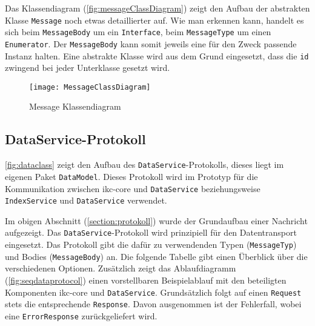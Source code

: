 Das Klassendiagram (\autoref{fig:messageClassDiagram}) zeigt den Aufbau der abstrakten Klasse \texttt{Message} noch etwas detaillierter auf. Wie man erkennen kann, handelt es sich beim \texttt{MessageBody} um ein \texttt{Interface}, beim \texttt{MessageType} um einen \texttt{Enumerator}. Der \texttt{MessageBody} kann somit jeweils eine für den Zweck passende Instanz halten. Eine abstrakte Klasse wird aus dem Grund eingesetzt, dass die \texttt{id} zwingend bei jeder Unterklasse gesetzt wird.

    \begin{figure}[H]
    \centering
    \texttt{[image: MessageClassDiagram]}
    \caption{Message Klassendiagram}
    \label{fig:messageClassDiagram}
    \end{figure}

\subsection{DataService-Protokoll}

\autoref{fig:dataclass} zeigt den Aufbau des \texttt{DataService}-Protokolls, dieses liegt im eigenen Paket \texttt{DataModel}. Dieses Protokoll wird im Prototyp für die Kommunikation zwischen \gls{ikc-core} und \texttt{DataService} beziehungsweise \texttt{IndexService} und \texttt{DataService} verwendet.

Im obigen Abschnitt (\autoref{section:protokoll}) wurde der Grundaufbau einer Nachricht aufgezeigt. Das \texttt{DataService}-Protokoll wird prinzipiell für den Datentransport eingesetzt. Das Protokoll gibt die dafür zu verwendenden Typen (\texttt{MessageTyp}) und Bodies (\texttt{MessageBody}) an. Die folgende Tabelle gibt einen Überblick über die verschiedenen Optionen. Zusätzlich zeigt das Ablaufdiagramm (\autoref{fig:seqdataprotocol}) einen vorstellbaren Beispielablauf mit den beteiligten Komponenten \gls{ikc-core} und \texttt{DataService}. Grundsätzlich folgt auf einen \texttt{Request} stets die entsprechende \texttt{Response}. Davon ausgenommen ist der Fehlerfall, wobei eine \texttt{ErrorResponse} zurückgeliefert wird.

